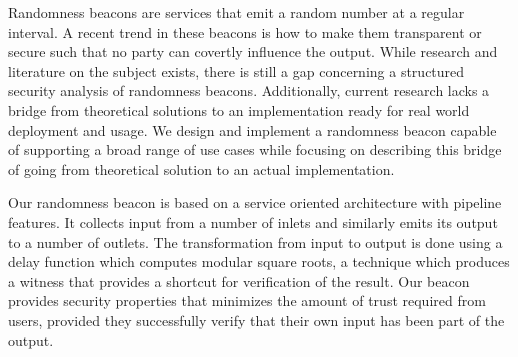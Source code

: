 Randomness beacons are services that emit a random number at a regular interval.
A recent trend in these beacons is how to make them transparent or secure such that no party can covertly influence the output.
While research and literature on the subject exists, there is still a gap concerning a structured security analysis of randomness beacons.
Additionally, current research lacks a bridge from theoretical solutions to an implementation ready for real world deployment and usage.
We design and implement a randomness beacon capable of supporting a broad range of use cases while focusing on describing this bridge of going from theoretical solution to an actual implementation.%


Our randomness beacon is based on a service oriented architecture with pipeline features.
It collects input from a number of inlets and similarly emits its output to a number of outlets.
The transformation from input to output is done using a delay function which computes modular square roots, a technique which produces a witness that provides a shortcut for verification of the result.
Our beacon provides security properties that minimizes the amount of trust required from users, provided they successfully verify that their own input has been part of the output.

